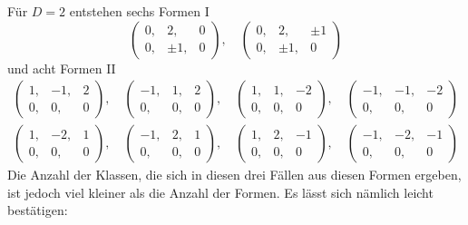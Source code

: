 Für \(D=2\) entstehen sechs Formen I
\[
\left(\begin{smallmatrix}0,&2,&0\\0,&\pm1,&0\end{smallmatrix}\right),\quad
\left(\begin{smallmatrix}0,&2,&\pm1\\0,&\pm1,&0\end{smallmatrix}\right)
\]
und acht Formen II
\[
\begin{gathered}
\left(\begin{smallmatrix}1,&-1,&2\\0,&0,&0\end{smallmatrix}\right),\quad
\left(\begin{smallmatrix}-1,&1,&2\\0,&0,&0\end{smallmatrix}\right),\quad
\left(\begin{smallmatrix}1,&1,&-2\\0,&0,&0\end{smallmatrix}\right),\quad
\left(\begin{smallmatrix}-1,&-1,&-2\\0,&0,&0\end{smallmatrix}\right)\\
\left(\begin{smallmatrix}1,&-2,&1\\0,&0,&0\end{smallmatrix}\right),\quad
\left(\begin{smallmatrix}-1,&2,&1\\0,&0,&0\end{smallmatrix}\right),\quad
\left(\begin{smallmatrix}1,&2,&-1\\0,&0,&0\end{smallmatrix}\right),\quad
\left(\begin{smallmatrix}-1,&-2,&-1\\0,&0,&0\end{smallmatrix}\right)
\end{gathered}
\]
Die Anzahl der Klassen, die sich in diesen drei Fällen aus diesen Formen ergeben, ist jedoch viel kleiner als die Anzahl der Formen. Es lässt sich nämlich leicht bestätigen:

